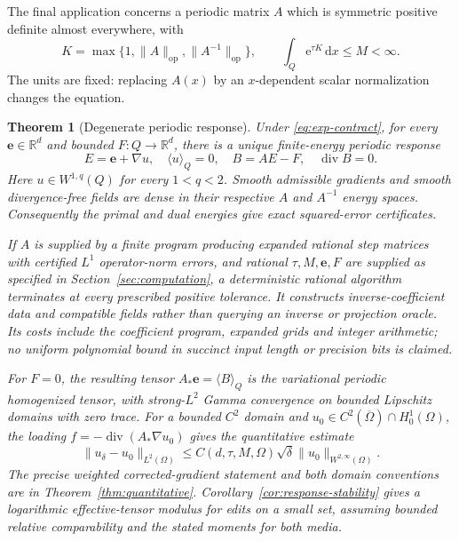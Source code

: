 \documentclass[11pt,a4paper]{article}
\numberwithin{equation}{section}
\newtheorem{theorem}{Theorem}[section]
\theoremstyle{definition}
\theoremstyle{remark}\newtheorem{remark}[theorem]{Remark}
\DeclareMathOperator{\diver}{div}
\newcommand{\R}{\mathbb R}
\newcommand{\ee}{\mathrm e}
\newcommand{\dd}{\,\mathrm dx}
\newcommand{\mean}[2]{\langle #1\rangle_{#2}}
\newcommand{\norm}[1]{\lVert #1\rVert}
\newcommand{\op}{\mathrm{op}}
\newcommand{\evec}{\boldsymbol e}
\begin{document}
The final application concerns a periodic matrix \(A\) which is symmetric
positive definite almost everywhere, with
\begin{equation}\label{eq:exp-contract}
 K=\max\{1,\norm A_{\op},\norm{A^{-1}}_{\op}\},
 \qquad \int_Q\ee^{\tau K}\dd\leq M<\infty.
\end{equation}
The units are fixed: replacing \(A(x)\) by an \(x\)-dependent scalar
normalization changes the equation.

\begin{theorem}[Degenerate periodic response]\label{thm:main-response}
Under \eqref{eq:exp-contract}, for every \(\evec\in\R^d\) and bounded
\(F:Q\to\R^d\), there is a unique finite-energy periodic response
\[
 E=\evec+\nabla u,\quad \mean uQ=0,\quad
 B=AE-F,\quad \diver B=0.
\]
Here \(u\in W^{1,q}(Q)\) for every \(1<q<2\).
Smooth admissible gradients and smooth divergence-free fields are dense in
their respective \(A\) and \(A^{-1}\) energy spaces.
Consequently the primal and dual energies give exact squared-error
certificates.

If \(A\) is supplied by a finite program producing expanded rational step
matrices with certified \(L^1\) operator-norm errors, and rational
\(\tau,M,\evec,F\) are supplied as specified in
Section~\ref{sec:computation}, a deterministic rational algorithm terminates
at every prescribed positive tolerance. It constructs inverse-coefficient
data and compatible fields rather than querying an inverse or projection
oracle. Its costs include the coefficient program, expanded grids and
integer arithmetic; no uniform polynomial bound in succinct input length
or precision bits is claimed.

For \(F=0\), the resulting tensor \(A_*\evec=\mean BQ\) is the variational
periodic homogenized tensor, with strong-\(L^2\) Gamma convergence on bounded
Lipschitz domains with zero trace.
For a bounded \(C^2\) domain and
\(u_0\in C^2(\overline\Omega)\cap H^1_0(\Omega)\), the loading
\(f=-\diver(A_*\nabla u_0)\) gives the quantitative estimate
\[
 \norm{u_\delta-u_0}_{L^2(\Omega)}
 \leq C(d,\tau,M,\Omega)\sqrt\delta
                         \norm{u_0}_{W^{2,\infty}(\Omega)} .
\]
The precise weighted corrected-gradient statement and both domain
conventions are in Theorem~\ref{thm:quantitative}.
Corollary~\ref{cor:response-stability} gives a logarithmic
effective-tensor modulus for edits on a small set, assuming
bounded relative comparability and the stated moments for both media.
\end{theorem}
\end{document}
